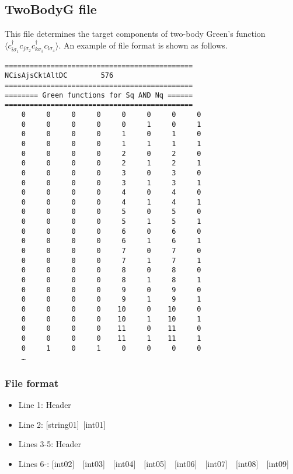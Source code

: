 \newpage
\subsection{TwoBodyG file}
\label{Subsec:twobodyg}
This file determines the target components of two-body Green's function $\langle c_{i\sigma_1}^{\dagger}c_{j\sigma_2}c_{k\sigma_3}^{\dagger}c_{l\sigma_4}\rangle$. An example of file format is shown as follows.

\begin{minipage}{12.5cm}
\begin{screen}
\begin{verbatim}
=============================================
NCisAjsCktAltDC        576
=============================================
======== Green functions for Sq AND Nq ======
=============================================
    0     0     0     0     0     0     0     0
    0     0     0     0     0     1     0     1
    0     0     0     0     1     0     1     0
    0     0     0     0     1     1     1     1
    0     0     0     0     2     0     2     0
    0     0     0     0     2     1     2     1
    0     0     0     0     3     0     3     0
    0     0     0     0     3     1     3     1
    0     0     0     0     4     0     4     0
    0     0     0     0     4     1     4     1
    0     0     0     0     5     0     5     0
    0     0     0     0     5     1     5     1
    0     0     0     0     6     0     6     0
    0     0     0     0     6     1     6     1
    0     0     0     0     7     0     7     0
    0     0     0     0     7     1     7     1
    0     0     0     0     8     0     8     0
    0     0     0     0     8     1     8     1
    0     0     0     0     9     0     9     0
    0     0     0     0     9     1     9     1
    0     0     0     0    10     0    10     0
    0     0     0     0    10     1    10     1
    0     0     0     0    11     0    11     0
    0     0     0     0    11     1    11     1
    0     1     0     1     0     0     0     0
    …
\end{verbatim}
\end{screen}
\end{minipage}

\subsubsection{File format}
 \begin{itemize}
   \item  Line 1:  Header
   \item  Line 2:   [string01]~[int01]
   \item  Lines 3-5:  Header
   \item  Lines 6-: 
   [int02]~~[int03]~~[int04]~~[int05]~~[int06]~~[int07]~~[int08]~~[int09]
  \end{itemize}
